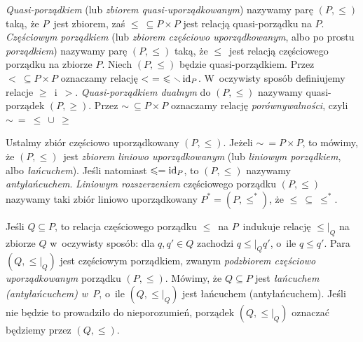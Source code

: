 \textit{Quasi-porządkiem} (lub \textit{zbiorem quasi-uporządkowanym}) nazywamy parę $(P,\leq)$ taką, że $P$~jest zbiorem, zaś $\leq\ \subseteq P\times P$ jest relacją quasi-porządku na $P$. \textit{Częściowym porządkiem} (lub \textit{zbiorem częściowo uporządkowanym}, albo po prostu \textit{porządkiem}) nazywamy parę $(P,\leq)$ taką, że $\leq$~jest relacją częściowego porządku na zbiorze $P$. Niech $(P,\leq)$ będzie quasi-porządkiem. Przez $<\ \subseteq P\times P$ oznaczamy relację $<\ =\ \leqslant\smallsetminus \operatorname{id}_P$. W~oczywisty sposób definiujemy relacje $\geq$~i~$>$. \textit{Quasi-porządkiem dualnym} do $(P,\leq)$ nazywamy quasi-porządek $(P,\geq)$. Przez $\sim\ \subseteq P\times P$ oznaczamy relację \textit{porównywalności}, czyli $\sim\ =\ \leq\ \cup\ \geq$

Ustalmy zbiór częściowo uporządkowany $(P,\leq)$. Jeżeli $\sim\ =P\times P$, to mówimy, że $(P,\leq)$~jest \textit{zbiorem liniowo uporządkowanym} (lub \textit{liniowym porządkiem}, albo \textit{łańcuchem}). Jeśli natomiast $\leqslant=\operatorname{id}_P$, to $(P,\leq)$ nazywamy \textit{antyłańcuchem}. \textit{Liniowym rozszerzeniem} częściowego porządku $(P,\leq)$ nazywamy taki zbiór liniowo uporządkowany $P^*=(P,\leq^*)$, że $\leq\ \subseteq\ \leq^*$.

Jeśli $Q\subseteq P$, to relacja częściowego porządku $\leq$~na $P$~indukuje relację $\leq\!\big |_Q$ na zbiorze $Q$ w~oczywisty sposób: dla $q,q'\in Q$ zachodzi $q\leq\!\big |_Q q'$, o~ile $q\leq q'$. Para $(Q,\leq\!\big |_Q)$ jest częściowym porządkiem, zwanym \textit{podzbiorem częściowo uporządkowanym} porządku $(P,\leq)$. Mówimy, że $Q\subseteq P$ jest \textit{łańcuchem (antyłańcuchem) w~$P$}, o~ile $(Q,\leq\big |_Q)$ jest łańcuchem (antyłańcuchem). Jeśli nie będzie to prowadziło do nieporozumień, porządek $(Q,\leq\!\big |_Q)$ oznaczać będziemy przez $(Q,\leq)$.

